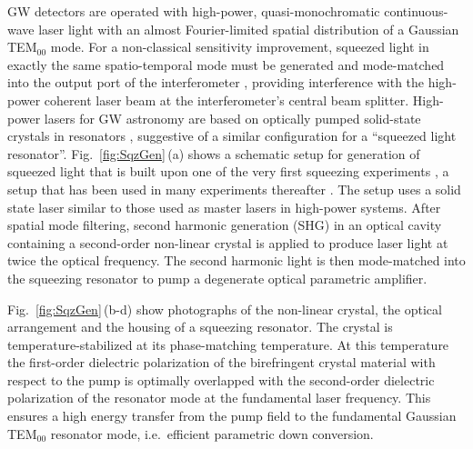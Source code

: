 GW detectors are operated with high-power, quasi-monochromatic
continuous-wave laser light with an almost Fourier-limited spatial
distribution of a Gaussian TEM$_{00}$ mode. For a non-classical
sensitivity improvement, squeezed light in exactly the same
spatio-temporal mode must be generated and mode-matched into the
output port of the interferometer \cite{Caves1981}, providing
interference with the high-power coherent laser beam at the
interferometer's central beam splitter. High-power lasers for GW
astronomy are based on optically pumped solid-state crystals in
resonators \cite{Frede2006}%
, suggestive of a similar configuration for
a ``squeezed light resonator''. Fig.~\ref{fig:SqzGen}\,(a) shows a
schematic setup for generation of squeezed light that is built upon one of the very first squeezing experiments \cite{Wu1986}, a setup that has been used in many experiments thereafter
\cite{Furusawa1998,Bowen2003,Schneider1998,Lam1999}. The setup uses a solid
state laser similar to those used as master lasers in high-power
systems. After spatial mode filtering, second harmonic
generation (SHG) in an optical cavity containing a second-order
non-linear crystal is applied to produce laser light at twice the
optical frequency. The second harmonic light is then mode-matched
into the squeezing resonator to pump a degenerate optical parametric amplifier.

Fig.~\ref{fig:SqzGen}\,(b-d) show photographs of the non-linear crystal, the optical arrangement and the housing of a squeezing resonator. The crystal is temperature-stabilized at its phase-matching temperature. At this temperature the first-order dielectric
polarization of the birefringent crystal material with respect to the pump is
optimally overlapped with the second-order dielectric polarization of
the resonator mode at the fundamental laser frequency. This ensures
a high energy transfer from the pump field to the fundamental
Gaussian TEM$_{00}$ resonator mode, i.e.\ efficient parametric down
conversion.

